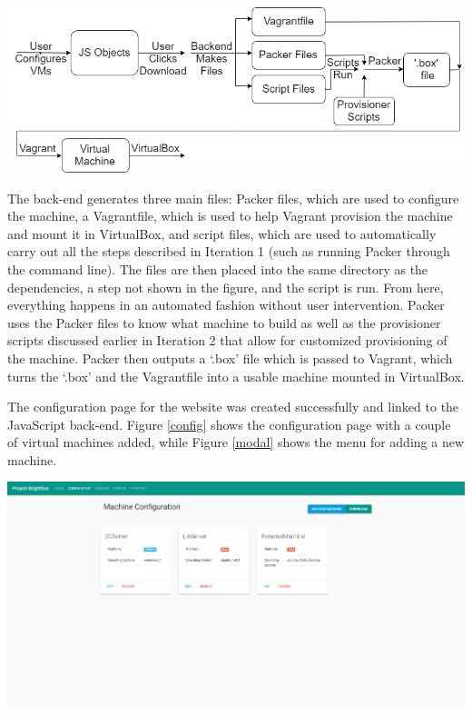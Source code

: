 \documentclass[openright]{report}
\begin{document}
\begin{center}
    \includegraphics[scale=0.58]{images/fullDiagram.png}
    \label{fullBuild}
\end{center}

\par The back-end generates three main files: Packer files, which are used to configure the machine, a Vagrantfile, which is used to help Vagrant provision the machine and mount it in VirtualBox, and script files, which are used to automatically carry out all the steps described in Iteration 1 (such as running Packer through the command line). The files are then placed into the same directory as the dependencies, a step not shown in the figure, and the script is run. From here, everything happens in an automated fashion without user intervention. Packer uses the Packer files to know what machine to build as well as the provisioner scripts discussed earlier in Iteration 2 that allow for customized provisioning of the machine. Packer then outputs a `.box' file which is passed to Vagrant, which turns the `.box' and the Vagrantfile into a usable machine mounted in VirtualBox.

\par The configuration page for the website was created successfully and linked to the JavaScript back-end. Figure \ref{config} shows the configuration page with a couple of virtual machines added, while Figure \ref{modal} shows the menu for adding a new machine.

\begin{center}
    \includegraphics[scale=0.33]{images/machines.png}
    \label{config}
\end{center}
\end{document}

